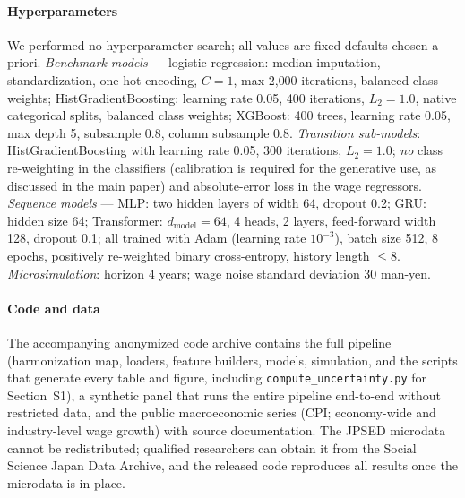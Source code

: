 \documentclass[letterpaper]{article}
\begin{document}
\paragraph{Hyperparameters}
We performed no hyperparameter search; all values are fixed defaults chosen a
priori. \emph{Benchmark models} --- logistic regression: median imputation,
standardization, one-hot encoding, $C{=}1$, max 2{,}000 iterations, balanced
class weights; HistGradientBoosting: learning rate 0.05, 400 iterations,
$L_2{=}1.0$, native categorical splits, balanced class weights; XGBoost: 400
trees, learning rate 0.05, max depth 5, subsample 0.8, column subsample 0.8.
\emph{Transition sub-models}: HistGradientBoosting with learning rate 0.05,
300 iterations, $L_2{=}1.0$; \emph{no} class re-weighting in the classifiers
(calibration is required for the generative use, as discussed in the main
paper) and absolute-error loss in the wage regressors. \emph{Sequence models}
--- MLP: two hidden layers of width 64, dropout 0.2; GRU: hidden size 64;
Transformer: $d_{\mathrm{model}}{=}64$, 4 heads, 2 layers, feed-forward width
128, dropout 0.1; all trained with Adam (learning rate $10^{-3}$), batch size
512, 8 epochs, positively re-weighted binary cross-entropy, history length
$\le 8$. \emph{Microsimulation}: horizon 4 years; wage noise standard
deviation 30 man-yen.

\paragraph{Code and data}
The accompanying anonymized code archive contains the full pipeline
(harmonization map, loaders, feature builders, models, simulation, and the
scripts that generate every table and figure, including
\texttt{compute\_uncertainty.py} for Section~S1), a synthetic panel that runs
the entire pipeline end-to-end without restricted data, and the public
macroeconomic series (CPI; economy-wide and industry-level wage growth) with
source documentation. The JPSED microdata cannot be redistributed; qualified
researchers can obtain it from the Social Science Japan Data Archive, and the
released code reproduces all results once the microdata is in place.
\end{document}
